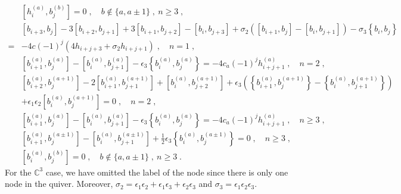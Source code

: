 \documentclass[11pt]{article}
\numberwithin{equation}{section}
\numberwithin{figure}{section}
\numberwithin{table}{section}
\begin{document}
\begin{subequations}
\begin{align}
		&\left[h^{(a)}_i,b^{(b)}_j\right]=0\;,\quad b\notin \{a,a\pm1\}\;,~n\geq3\;,\label{hbn3ab}\\
		&\left[b_{i+3},b_j\right]-3\left[b_{i+2},b_{j+1}\right]+3\left[b_{i+1},b_{j+2}\right]-\left[b_i,b_{j+3}\right]+\sigma_2(\left[b_{i+1},b_j\right]-\left[b_i,b_{j+1}\right])-\sigma_3\left\{b_i,b_j\right\}\nonumber\\
		=&-4c(-1)^j(4h_{i+j+3}+\sigma_2h_{i+j+1})\;,\quad n=1\;,\label{bbn1}\\
		&\left[b^{(a)}_{i+1},b^{(a)}_j\right]-\left[b^{(a)}_i,b^{(a)}_{j+1}\right]-\epsilon_3\left\{b^{(a)}_i,b^{(a)}_j\right\}=-4c_a(-1)^jh^{(a)}_{i+j+1}\;,\quad n=2\;,\label{bbn2aa}\\
		&\left[b^{(a)}_{i+2},b^{(a+1)}_j\right]-2\left[b^{(a)}_{i+1},b^{(a+1)}_{j+1}\right]+\left[b^{(a)}_i,b^{(a+1)}_{j+2}\right]+\epsilon_3\left(\left\{b^{(a)}_{i+1},b^{(a+1)}_j\right\}-\left\{b^{(a)}_i,b^{(a+1)}_{j+1}\right\}\right)\nonumber\\
		&+\epsilon_1\epsilon_2\left[b^{(a)}_i,b^{(a+1)}_j\right]=0\;,\quad n=2\label{bbn2aa+1}\;,\\
		&\left[b^{(a)}_{i+1},b^{(a)}_j\right]-\left[b^{(a)}_i,b^{(a)}_{j+1}\right]-\epsilon_3\left\{b^{(a)}_i,b^{(a)}_j\right\}=-4c_a(-1)^jh^{(a)}_{i+j+1}\;,\quad n\geq3\;,\label{bbn3aa}\\
		&\left[b^{(a)}_{i+1},b^{(a\pm1)}_j\right]-\left[b^{(a)}_i,b^{(a\pm1)}_{j+1}\right]+\frac{1}{2}\epsilon_3\left\{b^{(a)}_i,b^{(a\pm1)}_j\right\}=0\;,\quad n\geq3\;,\label{bbn3aa+-1}\\
		&\left[b^{(a)}_i,b^{(b)}_j\right]=0\;,\quad b\notin\{a,a\pm1\}\;,~n\geq3\label{n3bbab}\;.
	\end{align}
\end{subequations}
For the $\mathbb{C}^3$ case, we have omitted the label of the node since there is only one node in the quiver. Moreover, $\sigma_2=\epsilon_1\epsilon_2+\epsilon_1\epsilon_3+\epsilon_2\epsilon_3$ and $\sigma_3=\epsilon_1\epsilon_2\epsilon_3$.
\end{document}
